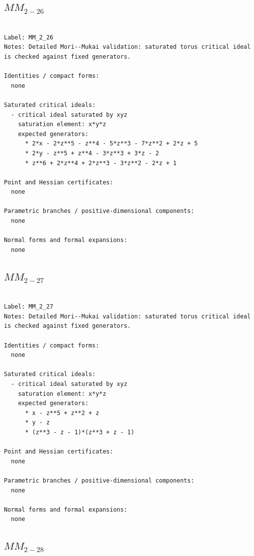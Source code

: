 \documentclass[10pt,a4paper]{article}
\begin{document}
\subsection*{$ MM_{2-26} $}

\begin{lstlisting}

Label: MM_2_26
Notes: Detailed Mori--Mukai validation: saturated torus critical ideal is checked against fixed generators.

Identities / compact forms:
  none

Saturated critical ideals:
  - critical ideal saturated by xyz
    saturation element: x*y*z
    expected generators:
      * 2*x - 2*z**5 - z**4 - 5*z**3 - 7*z**2 + 2*z + 5
      * 2*y - z**5 + z**4 - 3*z**3 + 3*z - 2
      * z**6 + 2*z**4 + 2*z**3 - 3*z**2 - 2*z + 1

Point and Hessian certificates:
  none

Parametric branches / positive-dimensional components:
  none

Normal forms and formal expansions:
  none

\end{lstlisting}

\subsection*{$ MM_{2-27} $}

\begin{lstlisting}

Label: MM_2_27
Notes: Detailed Mori--Mukai validation: saturated torus critical ideal is checked against fixed generators.

Identities / compact forms:
  none

Saturated critical ideals:
  - critical ideal saturated by xyz
    saturation element: x*y*z
    expected generators:
      * x - z**5 + z**2 + z
      * y - z
      * (z**3 - z - 1)*(z**3 + z - 1)

Point and Hessian certificates:
  none

Parametric branches / positive-dimensional components:
  none

Normal forms and formal expansions:
  none

\end{lstlisting}

\subsection*{$ MM_{2-28} $}
\end{document}
